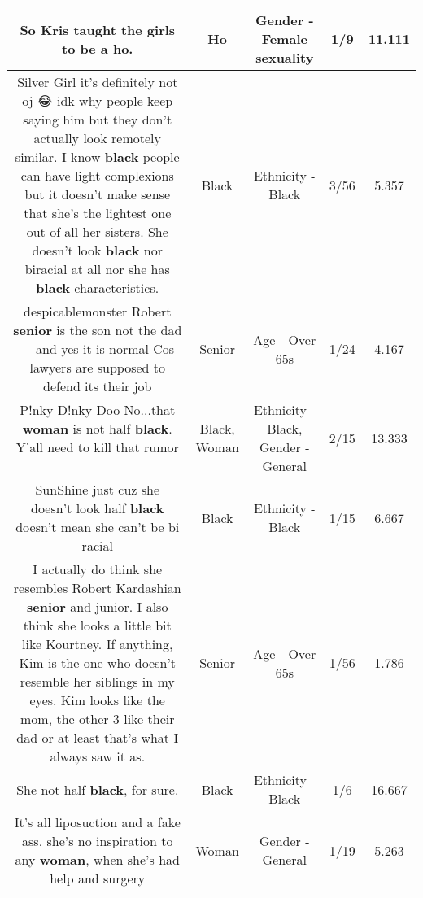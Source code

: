 \documentclass[11pt]{article}
\newlength\mylength
\begin{document}
\begin{center}
\begin{longtable}{|C{.65\mylength}|C{.30\mylength}|C{.12\mylength}|C{.12\mylength}|C{.12\mylength}|}
  \small So Kris taught the girls to be a \textbf{ho}.\normalsize   & Ho & Gender - Female sexuality & 1/9 & 11.111 \\  \hline
  \small Silver Girl it's definitely not oj 😂 idk why people keep saying him but they don't actually look remotely similar. I know \textbf{black} people can have light complexions but it doesn't make sense that she's the lightest one out of all her sisters. She doesn't look \textbf{black} nor biracial at all nor she has \textbf{black} characteristics.\normalsize   & Black & Ethnicity - Black & 3/56 & 5.357 \\  \hline
  \small despicablemonster Robert \textbf{senior} is the son not the dad 🤦🏽‍♀️ and yes it is normal Cos lawyers are supposed to defend its their job\normalsize   & Senior & Age - Over 65s & 1/24 & 4.167 \\  \hline
  \small P!nky D!nky Doo  No...that \textbf{woman} is not half \textbf{black}. Y'all need to kill that rumor🤦🏽‍♀️\normalsize   & Black, Woman & Ethnicity - Black, Gender - General & 2/15 & 13.333 \\  \hline
  \small SunShine just cuz she doesn't look half \textbf{black} doesn't mean she can't be bi racial\normalsize   & Black & Ethnicity - Black & 1/15 & 6.667 \\  \hline
  \small I actually do think she resembles Robert Kardashian \textbf{senior} and junior. I also think she looks a little bit like Kourtney. If anything, Kim is the one who doesn't resemble her siblings in my eyes. Kim looks like the mom, the other 3 like their dad or at least that's what I always saw it as.\normalsize   & Senior & Age - Over 65s & 1/56 & 1.786 \\  \hline
  \small She not half \textbf{black}, for sure.\normalsize   & Black & Ethnicity - Black & 1/6 & 16.667 \\  \hline
  \small It's all liposuction and a fake ass, she's no inspiration to any \textbf{woman}, when she's had help and surgery\normalsize   & Woman & Gender - General & 1/19 & 5.263 \\  \hline

\end{longtable}
\end{center}
\end{document}
